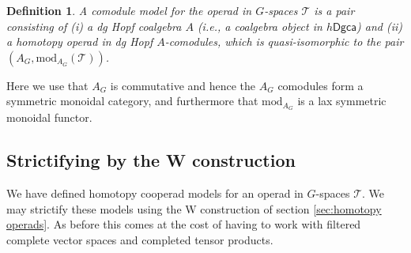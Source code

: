 \documentclass[a4paper]{amsart}
\theoremstyle{plain}
\newtheorem{defi}[thm]{Definition}
\theoremstyle{definition}
\newtheorem{rem}[thm]{Remark}
\newcommand{\K}{{\mathbb{K}}}
\newcommand{\op}{\mathcal}
\newcommand{\dgca}{\mathsf{Dgca}}
\renewcommand{\mod}{\mathrm{mod}}
\newcommand{\hdgca}{h\dgca}
\begin{document}
\begin{defi}
 A \emph{comodule model} for the operad in $G$-spaces $\op T$ is a pair consisting of (i) a dg Hopf coalgebra $A$ (i.e., a coalgebra object in $\hdgca$) and (ii) a homotopy operad in dg Hopf $A$-comodules, which is quasi-isomorphic to the pair $(A_G, \mod_{A_G}(\op T))$.
\end{defi}

Here we use that $A_G$ is commutative and hence the $A_G$ comodules form a symmetric monoidal category, and furthermore that $\mod_{A_G}$ is a lax symmetric monoidal functor.

% 


% 
% 


\subsection{Strictifying by the W construction}
We have defined homotopy cooperad models for an operad in $G$-spaces $\op T$.
We may strictify these models using the W construction of section \ref{sec:homotopy operads}.
As before this comes at the cost of having to work with filtered complete vector spaces and completed tensor products.
\end{document}
